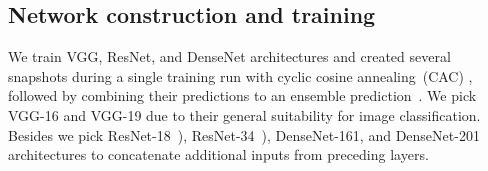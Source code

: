 \documentclass[conference]{IEEEtran}
\begin{document}
\subsection{Network construction and training}
We train VGG, ResNet, and DenseNet architectures and created several snapshots during a single training run with cyclic cosine annealing~(CAC)%
\cite{loshchilov2016sgdr}, followed by combining their predictions to an ensemble prediction~\cite{huang2017snapshot,karim2019snapshot}. We pick VGG-16 and VGG-19 due to their general suitability for image classification. 
Besides we pick ResNet-18~\cite{107}), ResNet-34~\cite{106}),  
DenseNet-161, and DenseNet-201 architectures to concatenate additional inputs from preceding layers. 
\end{document}
